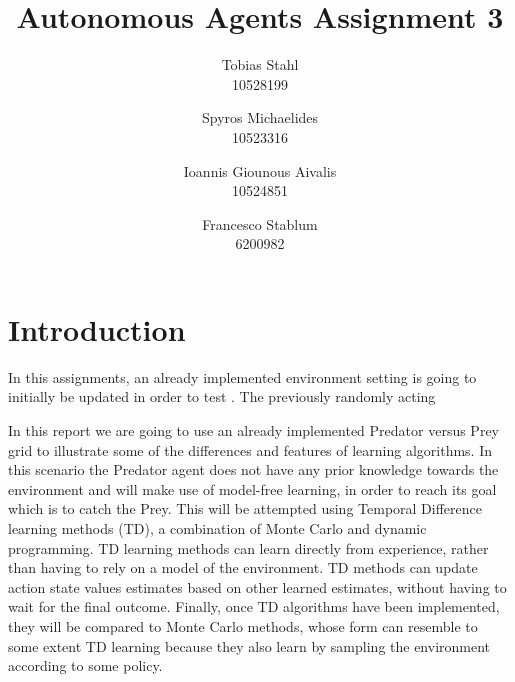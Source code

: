 \documentclass[a4paper,10pt]{article}
\title{
	\textbf{Autonomous Agents Assignment 3}
}
\author{Tobias Stahl \\ 10528199 \and Spyros Michaelides \\ 10523316 \and Ioannis Giounous Aivalis \\ 10524851 \and Francesco Stablum \\ 6200982}
\begin{document}
\maketitle


\section{Introduction}
In this assignments, an already implemented environment setting is going to initially be updated in order to test . The previously randomly acting 







In this report we are going to use an already implemented Predator versus Prey grid to illustrate some of the differences and features of learning algorithms. In this scenario the Predator agent does not have any prior knowledge towards the environment and will make use of model-free learning, in order to reach its goal which is to catch the Prey. This will be attempted using Temporal Difference learning methods (TD), a combination of Monte Carlo and dynamic programming. TD learning methods can learn directly from experience, rather than having to rely on a model of the environment. TD methods can update action state values estimates based on other learned estimates, without having to wait for the final outcome. Finally, once TD algorithms have been implemented, they will be compared to Monte Carlo methods, whose form can resemble to some extent TD learning because they also learn by sampling the environment according to some policy.










\end{document}
